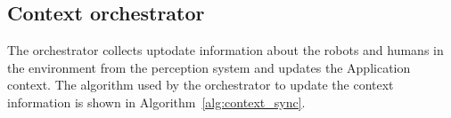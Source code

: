 
  
\subsection*{Context orchestrator} The orchestrator collects uptodate information about the robots and humans in the environment from the perception system and updates the Application context. The algorithm used by the orchestrator to update the context information is shown in Algorithm~\ref{alg:context_sync}.

